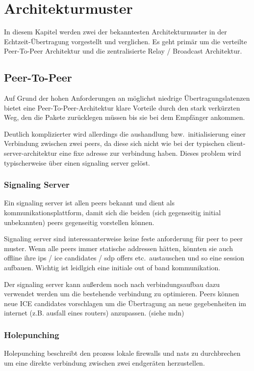 \documentclass[journal]{IEEEtran}
\begin{document}
\section{Architekturmuster}

In diesem Kapitel werden zwei der bekanntesten Architekturmuster in der
Echtzeit-Übertragung vorgestellt und verglichen. Es geht primär um die
verteilte Peer-To-Peer Architektur und die zentralisierte Relay / Broadcast
Architektur.

\subsection{Peer-To-Peer}

Auf Grund der hohen Anforderungen an möglichst niedrige Übertragungslatenzen
bietet eine Peer-To-Peer-Architektur klare Vorteile durch den stark verkürzten
Weg, den die Pakete zurücklegen müssen bis sie bei dem Empfänger ankommen.

Deutlich komplizierter wird allerdings die aushandlung bzw.\ initialisierung
einer Verbindung zwischen zwei peers, da diese sich nicht wie bei der typischen
client-server-architektur eine fixe adresse zur verbindung haben. Dieses
problem wird typischerweise über einen signaling server gelöst.

\subsubsection{Signaling Server}
Ein signaling server ist allen peers bekannt und dient als
kommunikationsplattform, damit sich die beiden (sich gegenseitig initial
unbekannten) peers gegenseitig vorstellen können.

Signaling server sind interessanterweise keine feste anforderung für peer to
peer muster. Wenn alle peers immer statische addressen hätten, könnten sie auch
offline ihre ips / ice candidates / sdp offers etc.\ austauschen und so eine
session aufbauen. Wichtig ist leidlgich eine initiale out of band
kommunikation.

Der signaling server kann außerdem noch nach verbindungsaufbau dazu verwendet
werden um die bestehende verbindung zu optimieren. Peers können neue ICE
candidates vorschlagen um die Übertragung an neue gegebenheiten im internet
(z.B. ausfall eines routers) anzupassen. (siehe mdn)


\subsubsection{Holepunching}
Holepunching beschreibt den prozess lokale firewalls und nats zu durchbrechen
um eine direkte verbindung zwischen zwei endgeräten herzustellen.
\end{document}
